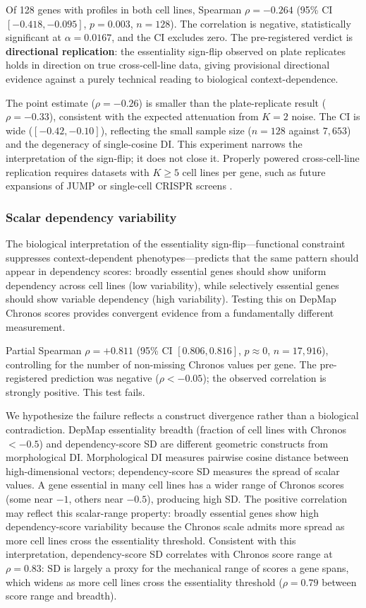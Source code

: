 \documentclass[11pt]{article}
\begin{document}
Of 128 genes with profiles in both cell lines, Spearman
$\rho = -0.264$ (95\% CI $[-0.418, -0.095]$, $p = 0.003$,
$n = 128$).  The correlation is negative, statistically significant
at $\alpha = 0.0167$, and the CI excludes zero.  The pre-registered
verdict is \textbf{directional replication}: the essentiality sign-flip
observed on plate replicates holds in direction on true
cross-cell-line data, giving provisional directional evidence against a
purely technical reading
to biological context-dependence.

The point estimate ($\rho = -0.26$) is smaller than the plate-replicate result
($\rho = -0.33$), consistent with the expected attenuation from $K = 2$
noise.  The CI is wide ($[-0.42, -0.10]$), reflecting the small
sample size ($n = 128$ against $7{,}653$) and the
degeneracy of single-cosine DI.  This experiment narrows the
interpretation of the sign-flip; it does not close it.  Properly powered
cross-cell-line replication requires datasets with $K \geq 5$ cell
lines per gene, such as future expansions of JUMP or single-cell CRISPR
screens \citep{tahoe2025}.

\subsubsection{Scalar dependency variability}

The biological interpretation of the essentiality sign-flip---functional
constraint suppresses context-dependent phenotypes---predicts that the
same pattern should appear in dependency scores: broadly essential genes
should show uniform dependency across cell lines (low variability),
while selectively essential genes should show variable dependency (high
variability).  Testing this on DepMap Chronos scores provides convergent
evidence from a fundamentally different measurement.

Partial Spearman $\rho = +0.811$ (95\% CI $[0.806, 0.816]$,
$p \approx 0$, $n = 17{,}916$), controlling for the number of
non-missing Chronos values per gene.  The pre-registered prediction
was negative ($\rho < -0.05$); the observed correlation is strongly
positive.  This test fails.

We hypothesize the failure reflects a construct divergence rather than
a biological contradiction.  DepMap essentiality breadth
(fraction of cell lines with Chronos $< -0.5$) and dependency-score SD
are different geometric constructs from morphological DI.  Morphological
DI measures pairwise cosine distance between high-dimensional vectors;
dependency-score SD measures the spread of scalar values.  A gene
essential in many cell lines has a wider range of Chronos
scores (some near $-1$, others near $-0.5$), producing high SD.  The
positive correlation may reflect this scalar-range property: broadly
essential genes show high dependency-score variability because
the Chronos scale admits more spread as more cell lines cross the
essentiality threshold.  Consistent with this interpretation,
dependency-score SD correlates with Chronos score range at
$\rho = 0.83$: SD is largely a proxy for the mechanical range of
scores a gene spans, which widens as more cell lines cross the
essentiality threshold ($\rho = 0.79$ between score range and
breadth).
\end{document}
